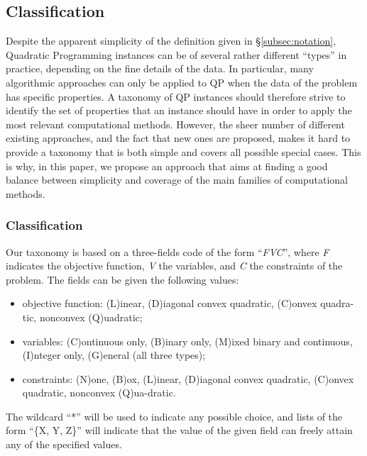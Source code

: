 

\subsection{Classification}\label{sec:classification}

Despite the apparent simplicity of the definition given in \S \ref{subsec:notation}, Quadratic Programming instances can be of several rather different ``types'' in practice, depending on the fine details of the data. In particular, many algorithmic approaches can only be applied to QP when the data of the problem has specific properties. A taxonomy of QP instances should therefore strive to identify the set of properties that an instance should have in order to apply the most relevant computational methods. However, the sheer number of different existing approaches, and the fact that new ones are proposed, makes it hard to provide a taxonomy that is both simple and covers all possible special cases. This is why, in this paper, we propose an approach that aims at finding a good balance between simplicity and coverage of the main families of computational methods.

\subsubsection{Classification}\label{ssec:taxonomy}

Our taxonomy is based on a three-fields code of the form ``\textit{FVC}'', where \textit{F} indicates the objective function, \textit{V} the variables, and \textit{C} the constraints of the problem. The fields can be given the following values:
%
\begin{itemize}
 \item objective function: (L)inear, (D)iagonal convex quadratic, (C)onvex quadra-tic, nonconvex (Q)uadratic;
 \item variables: (C)ontinuous only, (B)inary only, (M)ixed binary and continuous, (I)nteger only, (G)eneral (all three types);
 \item constraints: (N)one, (B)ox, (L)inear, (D)iagonal convex quadratic, (C)onvex quadratic, nonconvex (Q)ua-dratic.
\end{itemize}
%
The wildcard ``*'' will be used to indicate any possible choice, and lists of the form ``\{X, Y, Z\}'' will indicate that the value of the given field can freely attain any of the specified values.

